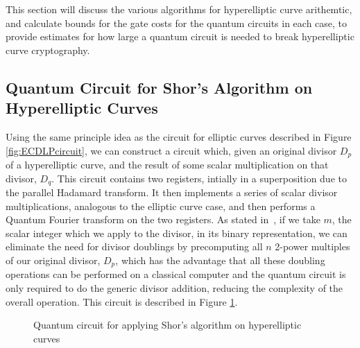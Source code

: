 This section will discuss the various algorithms for hyperelliptic curve arithemtic, and calculate bounds for the gate costs for the quantum circuits in each case, to provide estimates for how large a quantum circuit is needed to break hyperelliptic curve cryptography.
\subsection{Quantum Circuit for Shor's Algorithm on Hyperelliptic Curves}
Using the same principle idea as the circuit for elliptic curves described in Figure \ref{fig:ECDLPcircuit}, we can construct a circuit which, given an original divisor $D_p$ of a hyperelliptic curve, and the result of some scalar multiplication on that divisor, $D_q$. This circuit contains two registers, intially in a superposition due to the parallel Hadamard transform. It then implements a series of scalar divisor multiplications, analogous to the elliptic curve case, and then performs a Quantum Fourier transform on the two registers. As stated in~\cite{roetteler2017quantum}, if we take $m$, the scalar integer which we apply to the divisor, in its binary representation, we can eliminate the need for divisor doublings by precomputing all $n$ 2-power multiples of our original divisor, $D_p$, which has the advantage that all these doubling operations can be performed on a classical computer and the quantum circuit is only required to do the generic divisor addition, reducing the complexity of the overall operation. This circuit is described in Figure \ref{fig:HECDLPCircuit}.
\begin{figure}[!htb]
\centering
\resizebox{\linewidth}{!}{}
\caption{Quantum circuit for applying Shor's algorithm on hyperelliptic curves}
\label{fig:HECDLPCircuit}
\end{figure}
